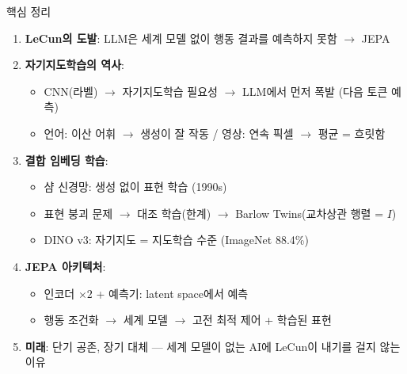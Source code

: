 \documentclass[aspectratio=169,10pt]{beamer}
\begin{document}
\begin{frame}{핵심 정리}
\begin{enumerate}
  \item \textbf{LeCun의 도발}: LLM은 세계 모델 없이 행동 결과를 예측하지 못함 $\to$ JEPA
  \vspace{0.2em}
  \item \textbf{자기지도학습의 역사}:
    \begin{itemize}
      \footnotesize
      \item CNN(라벨) $\to$ 자기지도학습 필요성 $\to$ LLM에서 먼저 폭발 (다음 토큰 예측)
      \item 언어: 이산 어휘 $\to$ 생성이 잘 작동 / 영상: 연속 픽셀 $\to$ 평균 = 흐릿함
    \end{itemize}
  \vspace{0.2em}
  \item \textbf{결합 임베딩 학습}:
    \begin{itemize}
      \footnotesize
      \item 샴 신경망: 생성 없이 표현 학습 (1990s)
      \item 표현 붕괴 문제 $\to$ 대조 학습(한계) $\to$ Barlow Twins(교차상관 행렬 = $I$)
      \item DINO v3: 자기지도 = 지도학습 수준 (ImageNet 88.4\%)
    \end{itemize}
  \vspace{0.2em}
  \item \textbf{JEPA 아키텍처}:
    \begin{itemize}
      \footnotesize
      \item 인코더 $\times 2$ + 예측기: latent space에서 예측
      \item 행동 조건화 $\to$ 세계 모델 $\to$ 고전 최적 제어 + 학습된 표현
    \end{itemize}
  \vspace{0.2em}
  \item \textbf{미래}: 단기 공존, 장기 대체 --- 세계 모델이 없는 AI에 LeCun이 내기를 걸지 않는 이유
\end{enumerate}
\end{frame}
\end{document}

